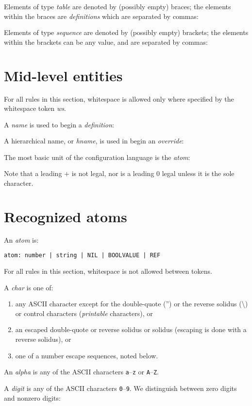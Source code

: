 \documentclass{memarticle}
\begin{document}
Elements of type \emph{table} are denoted by (possibly empty) braces;
the elements within the braces
are \emph{definitions}
which are separated by commas:

Elements of type \emph{sequence} are denoted by (possibly empty) brackets;
the elements within the brackets can be any value,
and are separated by commas:

\section{Mid-level entities}

For all rules in this section,
whitespace is allowed only where specified by the whitespace token \emph{ws}.

A \emph{name} is used to begin a \emph{definition}:

\break
A hierarchical name,
or \emph{hname},
is used in begin an \emph{override}:

The most basic unit of the configuration language is the \emph{atom}:

Note that a leading $+$ is not legal,
nor is a leading 0 legal unless it is the sole character.

\section{Recognized atoms}

An \emph{atom} is: 
\begin{verbatim}
atom: number | string | NIL | BOOLVALUE | REF
\end{verbatim}


For all rules in this section,
whitespace is not allowed between tokens.

A \emph{char} is one of:
\begin{enumerate}
\item any ASCII character except for
the double-quote ('') 
or the reverse solidus (\textbackslash)
or control characters
(\emph{printable} characters), or
\item an escaped double-quote or reverse solidus or solidus
(escaping is done with a reverse solidus), or
\item one of a number escape sequences, noted below.
\end{enumerate}

An \emph{alpha} is any of the ASCII characters \texttt{a}--\texttt{z}
or \texttt{A}--\texttt{Z}.

A \emph{digit} is any of the ASCII characters \texttt{0}--\texttt{9}.
We distinguish between zero digits and nonzero digits:
\end{document}

